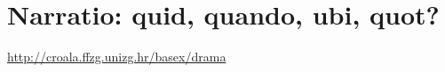 \documentclass[14pt]{beamer}
\begin{document}
{
    \begin{frame}[plain]
    \end{frame}
    }



\section{Narratio: quid, quando, ubi, quot?}

\begin{frame}[plain]
  \url{http://croala.ffzg.unizg.hr/basex/drama}
    \end{frame}



{
    \begin{frame}[plain]
    \end{frame}
}
\end{document}
